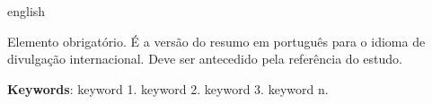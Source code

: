 \setlength{\absparsep}{18pt} %
\begin{resumo}[Abstract]
	
	\begin{otherlanguage*}{english}
		
		Elemento obrigatório. É a versão do resumo em português para o idioma de divulgação internacional. Deve ser antecedido pela referência do estudo.
		
		\vspace{\onelineskip}
		 
		\textbf{Keywords}: keyword 1. keyword 2. keyword 3. keyword n.
		
	\end{otherlanguage*}

\end{resumo} 